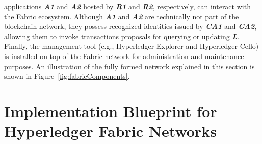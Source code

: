\documentclass[conference]{IEEEtran}
\begin{document}
applications \textbf{\textit{A1}} and \textbf{\textit{A2}} hosted by \textbf{\textit{R1}} and \textbf{\textit{R2}}, respectively, can interact with the Fabric ecosystem. Although \textbf{\textit{A1}} and \textbf{\textit{A2}} are technically not part of the blockchain network, they possess recognized identities issued by \textbf{\textit{CA1}} and \textbf{\textit{CA2}}, allowing them to invoke transactions proposals for querying or updating \textbf{\textit{L}}. Finally, the management tool \textbf{} (e.g., Hyperledger Explorer and Hyperledger Cello) is installed on top of the Fabric network for administration and maintenance purposes. An illustration of the fully formed network explained in this section is shown in Figure~\ref{fig:fabricComponents}.

\section{Implementation Blueprint for Hyperledger Fabric Networks}
\end{document}
